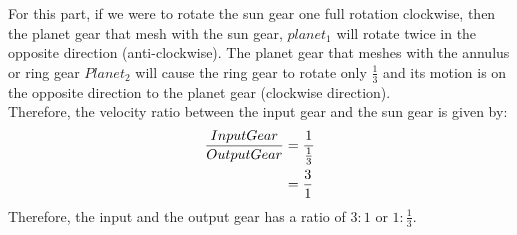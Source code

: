 For this part, if we were to rotate the sun gear one full rotation clockwise, then the planet gear that mesh with the sun gear, $planet_1$ will rotate twice in the opposite direction (anti-clockwise). The planet gear that meshes with the annulus or ring gear $Planet_2$ will cause the ring gear to rotate only $\frac{1}{3}$ and its motion is on the opposite direction to the planet gear (clockwise direction).\\

Therefore, the velocity ratio between the input gear and the sun gear is given by:
\begin{align}
\frac{Input Gear}{Output Gear} &= \frac{1}{\frac{1}{3}} \notag \\
\qquad &= \frac{3}{1} \notag
\end{align}
Therefore, the input and the output gear has a ratio of $3:1$ or $1:\frac{1}{3}$.